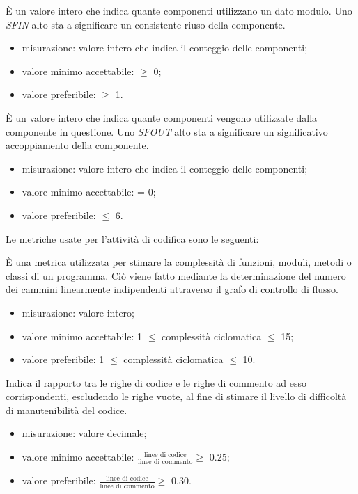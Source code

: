 		
			È un valore intero che indica quante componenti utilizzano un dato modulo. Uno \textit{SFIN} alto sta a significare un consistente riuso della componente.
		\begin{itemize}
			\item{misurazione: valore intero che indica il conteggio delle componenti;}
			\item{valore minimo accettabile: $\geq$ 0;}
			\item{valore preferibile: $\geq$ 1.}
		\end{itemize}
	
			È un valore intero che indica quante componenti vengono utilizzate dalla componente in questione. Uno \textit{SFOUT} alto sta a significare un significativo accoppiamento della componente.
		\begin{itemize}
			\item{misurazione: valore intero che indica il conteggio delle componenti;}
			\item{valore minimo accettabile: = 0;}
			\item{valore preferibile: $\leq$ 6.}
		\end{itemize}
		
		Le metriche usate per l'attività di codifica sono le seguenti:
					
		È una metrica utilizzata per stimare la complessità di funzioni, moduli, metodi o classi di un programma. Ciò viene fatto mediante la determinazione del numero dei cammini linearmente indipendenti attraverso il grafo di controllo di flusso.
		\begin{itemize}
			\item{misurazione: valore intero;}
			\item{valore minimo accettabile: 1 $\leq$ complessità ciclomatica $\leq$ 15;}
			\item{valore preferibile: 1 $\leq$ complessità ciclomatica $\leq$ 10.}
		\end{itemize}
			
		Indica il rapporto tra le righe di codice e le righe di commento ad esso corrispondenti, escludendo le righe vuote, al fine di stimare il livello di difficoltà di manutenibilità del codice. 	
		\begin{itemize}
			\item{misurazione: valore decimale;}
			\item{valore minimo accettabile: $\displaystyle\frac{\mbox{linee di codice}}{\mbox{linee di commento}} \geq$ 0.25;}
			\item{valore preferibile: $\displaystyle\frac{\mbox{linee di codice}}{\mbox{linee di commento}} \geq$ 0.30.}
		\end{itemize}

